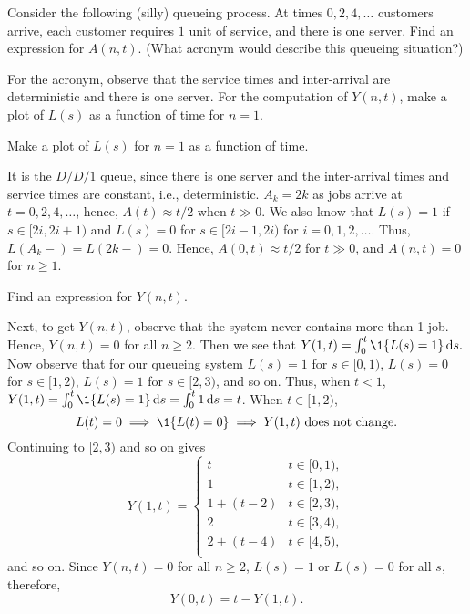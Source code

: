  \begin{exercise}  
Consider the following (silly) queueing process.
   At times $0, 2,4, \ldots$ customers arrive, each customer requires $1$ unit of service, and there is one server.
   Find an expression for $A(n,t)$.
   (What acronym would describe this queueing situation?)
\begin{hint}
    For the acronym, observe that the service times and inter-arrival are deterministic and there is one server.
    For the computation of $Y(n,t)$, make a plot of $L(s)$ as a function of time for $n=1$.

    Make a plot of $L(s)$ for $n=1$ as a function of time.
\end{hint}
\begin{solution}
      It is the $D/D/1$ queue, since there is one server and the inter-arrival times and service times are constant, i.e., deterministic.
      $A_k = 2k$ as jobs arrive at $t=0, 2, 4, \ldots$, hence, $A(t) \approx t/2$ when $t\gg 0$.
      We also know that $L(s)=1$ if $s\in [2i, 2i+1)$ and $L(s)=0$ for $s\in[2i-1, 2i)$ for $i=0, 1, 2, \ldots$.
      Thus, $L(A_k-) = L(2k-)=0$.
      Hence, $A(0,t) \approx t/2$ for $t\gg 0$, and $A(n,t)=0$ for $n\geq 1$.
\end{solution}
\end{exercise}


\begin{exercise}  
  Find an expression for $Y(n,t)$.
\begin{solution}
      Next, to get $Y(n,t)$, observe that the system never contains
      more than 1 job. Hence, $Y(n,t)=0$ for all $n\geq 2$.  Then we see that
      $Y(1,t) = \int_0^t \1{L(s) = 1}\d s.$ Now observe that for our
      queueing system $L(s)=1$ for $s\in[0,1)$, $L(s)=0$ for
      $s\in[1,2)$, $L(s)=1$ for $s\in[2,3)$, and so on. Thus, when
      $t<1$, $Y(1,t)=\int_0^t \1{L(s)=1} \d s = \int_0^t 1\d s = t$.
      When $t\in[1,2)$, 
      \begin{equation*}
        L(t)=0 \implies \1{L(t)=0} \implies Y(1,t) \text{ does not change}.
      \end{equation*}
Continuing to $[2,3)$ and so on gives
    \begin{equation*}
      Y(1,t) =
      \begin{cases}
        t & t\in[0,1), \\
        1 & t\in[1,2), \\
        1+(t-2) & t\in[2,3), \\
        2 & t\in[3,4), \\
        2+(t-4) & t\in[4,5), \\
      \end{cases}
    \end{equation*}
    and so on.  Since $Y(n,t)=0$ for all $n\geq 2$, $L(s) = 1$ or
    $L(s)=0$ for all $s$, therefore, 
    \begin{equation*}
      Y(0,t) = t-Y(1,t).
    \end{equation*}
\end{solution}
\end{exercise}


